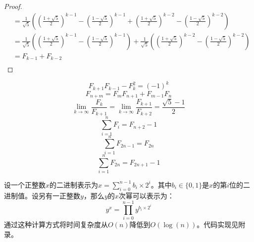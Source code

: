 \begin{theorem}[斐波那契的通项公式]
\begin{proof}
\begin{equation}
\begin{aligned}
                &=\frac{1}{\sqrt{5}}\left( \left( \frac{1+\sqrt{5}}{2} \right) ^{k-1}-\left( \frac{1-\sqrt{5}}{2} \right) ^{k-1}+\left( \frac{1+\sqrt{5}}{2} \right) ^{k-2}-\left( \frac{1-\sqrt{5}}{2} \right) ^{k-2} \right)\\
                &=\frac{1}{\sqrt{5}}\left( \left( \frac{1+\sqrt{5}}{2} \right) ^{k-1}-\left( \frac{1-\sqrt{5}}{2} \right) ^{k-1} \right) +\frac{1}{\sqrt{5}}\left( \left( \frac{1+\sqrt{5}}{2} \right) ^{k-2}-\left( \frac{1-\sqrt{5}}{2} \right) ^{k-2} \right)\\
                &=F_{k-1}+F_{k-2}\\
            \end{aligned}
        \end{equation}
    \end{proof}
\end{theorem}

\begin{corollary}[关于斐波那契数列的一些等式]
    \begin{equation}
        F_{k+1}F_{k-1}-F_{k}^{2}=(-1)^k
    \end{equation}
    \begin{equation}
        F_{n+m}=F_mF_{n+1}+F_{m-1}F_n
    \end{equation}
    \begin{equation}
        \lim_{k\rightarrow \infty} \frac{F_k}{F_{k+1}}=\lim_{k\rightarrow \infty} \frac{F_{k+1}}{F_{k+2}}=\frac{\sqrt{5}-1}{2}
    \end{equation}
    \begin{equation}
        \sum_{i=1}^n{F_i}=F_{n+2}-1
    \end{equation}
    \begin{equation}
        \sum_{i=1}^n{F_{2n-1}}=F_{2n}
    \end{equation}
    \begin{equation}
        \sum_{i=1}^n{F_{2n}}=F_{2n+1}-1
    \end{equation}
    
\end{corollary}

\begin{lemma}[整数快速幂]\label{lem:lem1}
    设一个正整数$x$的二进制表示为$x=\sum_{i=0}^{n-1}{b_i\times 2^i}$。其中$b_i\in\{0, 1\}$是$x$的第$i$位的二进制值。设另有一正整数$y$，那么$y$的$x$次幂可以表示为：
    \begin{equation}
        y^x=\prod_{i=0}^{n-1}{y^{b_i\times 2^i}}
    \end{equation}
    通过这种计算方式将时间复杂度从$O(n)$降低到$O(\log(n))$。代码实现见附录。
\end{lemma}

